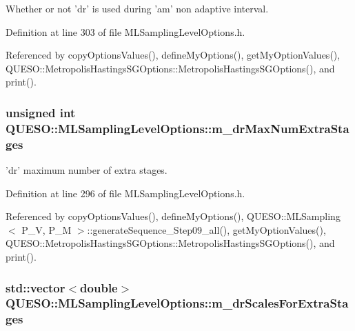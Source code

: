 Whether or not 'dr' is used during 'am' non adaptive interval. 



Definition at line 303 of file M\-L\-Sampling\-Level\-Options.\-h.



Referenced by copy\-Options\-Values(), define\-My\-Options(), get\-My\-Option\-Values(), Q\-U\-E\-S\-O\-::\-Metropolis\-Hastings\-S\-G\-Options\-::\-Metropolis\-Hastings\-S\-G\-Options(), and print().

\hypertarget{class_q_u_e_s_o_1_1_m_l_sampling_level_options_ab854494640bb98cad74ee656e62daab3}{
\subsubsection[{m\-\_\-dr\-Max\-Num\-Extra\-Stages}]{\setlength{\rightskip}{0pt plus 5cm}unsigned int Q\-U\-E\-S\-O\-::\-M\-L\-Sampling\-Level\-Options\-::m\-\_\-dr\-Max\-Num\-Extra\-Stages}}\label{class_q_u_e_s_o_1_1_m_l_sampling_level_options_ab854494640bb98cad74ee656e62daab3}


'dr' maximum number of extra stages. 



Definition at line 296 of file M\-L\-Sampling\-Level\-Options.\-h.



Referenced by copy\-Options\-Values(), define\-My\-Options(), Q\-U\-E\-S\-O\-::\-M\-L\-Sampling$<$ P\-\_\-\-V, P\-\_\-\-M $>$\-::generate\-Sequence\-\_\-\-Step09\-\_\-all(), get\-My\-Option\-Values(), Q\-U\-E\-S\-O\-::\-Metropolis\-Hastings\-S\-G\-Options\-::\-Metropolis\-Hastings\-S\-G\-Options(), and print().

\hypertarget{class_q_u_e_s_o_1_1_m_l_sampling_level_options_ab4bdcc9166bc8cdbc9f5915dcb77e34a}{
\subsubsection[{m\-\_\-dr\-Scales\-For\-Extra\-Stages}]{\setlength{\rightskip}{0pt plus 5cm}std\-::vector$<$double$>$ Q\-U\-E\-S\-O\-::\-M\-L\-Sampling\-Level\-Options\-::m\-\_\-dr\-Scales\-For\-Extra\-Stages}}\label{class_q_u_e_s_o_1_1_m_l_sampling_level_options_ab4bdcc9166bc8cdbc9f5915dcb77e34a}


